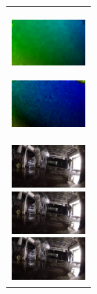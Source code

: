 \begin{figure}[htbp]
\begin{tabular}{l}
      \begin{minipage}{0.165\hsize}
        \begin{center}
          \includegraphics[clip, width=2.5cm]{./Figures/optic_stop1-4.eps}
          \hspace{0.1cm} { }
        \end{center}
      \end{minipage}
      \begin{minipage}{0.165\hsize}
        \begin{center}
          \includegraphics[clip, width=2.5cm]{./Figures/optic_stop1-5.eps}
          \hspace{2.2cm} { }
        \end{center}
      \end{minipage}
\\ %
      \begin{minipage}{0.165\hsize}
        \begin{center}
          \includegraphics[clip, width=2.5cm]{./Figures/still_stop2-1.eps}
        \end{center}
      \end{minipage}
      \begin{minipage}{0.165\hsize}
        \begin{center}
          \includegraphics[clip, width=2.5cm]{./Figures/still_stop2-2.eps}
        \end{center}
      \end{minipage}
      \begin{minipage}{0.165\hsize}
        \begin{center}
          \includegraphics[clip, width=2.5cm]{./Figures/still_stop2-3.eps}

\end{center}
\end{minipage}
\end{tabular}
\end{figure}
